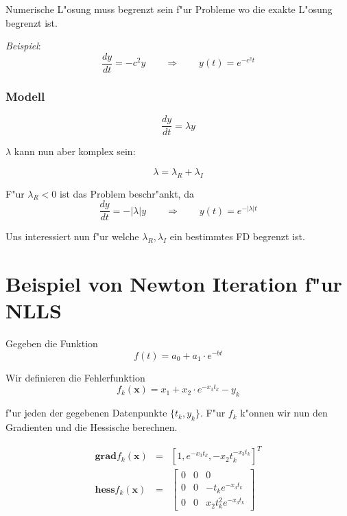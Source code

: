 \documentclass[german, 10pt, a4paper, twocolumn]{scrartcl}
\begin{document}
Numerische L"osung muss begrenzt sein f"ur Probleme wo die exakte L"osung begrenzt ist.

\textit{Beispiel}:
\begin{displaymath}
	\frac{dy}{dt} = -c^2y \qquad \Rightarrow \qquad y(t)=e^{-c^2t}
\end{displaymath}

\subsubsection{Modell}

\begin{displaymath}
	\frac{dy}{dt} = \lambda y
\end{displaymath}

$\lambda$ kann nun aber komplex sein:

\begin{displaymath}
	\lambda = \lambda_R + \lambda_I
\end{displaymath}

F"ur $\lambda_R < 0$ ist das Problem beschr"ankt, da
\begin{displaymath}
	\frac{dy}{dt} = -|\lambda| y \qquad \Rightarrow \qquad y(t) = e^{-|\lambda|t}
\end{displaymath}

Uns interessiert nun f"ur welche $\lambda_R, \lambda_I$ ein bestimmtes FD begrenzt ist. 

\appendix

\section{Beispiel von Newton Iteration f"ur NLLS}

Gegeben die Funktion
\begin{displaymath}
	f(t) = a_0 + a_1 \cdotp e^{-bt}
\end{displaymath}

Wir definieren die Fehlerfunktion
\begin{displaymath}
	f_k(\mathbf{x}) = x_1 + x_2 \cdotp e^{-x_3 t_k} - y_k
\end{displaymath}

f"ur jeden der gegebenen Datenpunkte $\{ t_k, y_k\}$. F"ur $f_k$ k"onnen wir nun den Gradienten und die Hessische berechnen.

\begin{eqnarray*}
	\mathbf{\text{grad}}f_k(\mathbf{x}) &	= &	[1, e^{- x_3 t_k}, -x_2 t_k^{- x_3 t_k}]^T\\
	\mathbf{\text{hess}}f_k(\mathbf{x}) &	= & \left [ 
		\begin{array}{ccc}
			0 &	0 &	0\\
			0 &	0 &	-t_k e^{-x_3 t_k}\\
			0 &	0 &	x_2 t_k^2 e^{-x_3 t_k}
		\end{array}
	\right ]
\end{eqnarray*}
\end{document}
